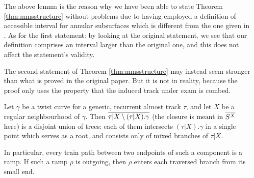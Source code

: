 The above lemma is the reason why we have been able to state Theorem \ref{thm:mmsstructure} without problems due to having employed a definition of accessible interval for annular subsurfaces which is different from the one given in \cite{mms}. As for the first statement: by looking at the original statement, we see that our definition comprises an interval larger than the original one, and this does not affect the statement's validity.

The second statement of Theorem \ref{thm:mmsstructure} may instead seem stronger than what is proved in the original paper. But it is not in reality, because the proof only uses the property that the induced track under exam is combed.

\begin{lemma}\label{lem:twistcurvetrees}
Let $\gamma$ be a twist curve for a generic, recurrent almost track $\tau$, and let $X$ be a regular neighbourhood of $\gamma$. Then $\overline{\tau|X\setminus (\tau|X).\gamma}$ (the closure is meant in $\overline{S^X}$ here) is a disjoint union of trees: each of them intersects $(\tau|X).\gamma$ in a single point which serves as a root, and consists only of mixed branches of $\tau|X$. 

In particular, every train path between two endpoints of such a component is a ramp. If such a ramp $\rho$ is outgoing, then $\rho$ enters each traversed branch from its small end.
\end{lemma}
